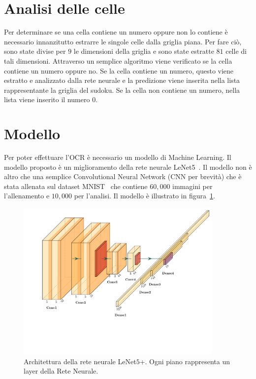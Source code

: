 \documentclass[a4paper, 10pt]{article}
\newcommand{\lenet}{LeNet\(5\)+}
\begin{document}
\section{Analisi delle celle}

Per determinare se una cella contiene un numero oppure non lo contiene è necessario innanzitutto
estrarre le singole celle dalla griglia piana. Per fare ciò, sono state divise
per \(9\) le dimensioni della griglia e sono state estratte \(81\) celle di tali
dimensioni. Attraverso un semplice algoritmo viene verificato se la cella
contiene un numero oppure no. Se la cella contiene un numero, questo viene
estratto e analizzato dalla rete neurale e la predizione viene inserita nella
lista rappresentante la griglia del sudoku. Se la cella non contiene un numero,
nella lista viene inserito il numero \(0\).


\section{Modello}

Per poter effettuare l'OCR è necessario un modello di Machine Learning. Il
modello proposto è un miglioramento della rete neurale
LeNet5~\cite{lecun1998gradient}. Il modello non è altro che una semplice
Convolutional Neural Network (CNN per brevità) che è stata allenata sul dataset
MNIST~\cite{deng2012mnist} che contiene \(60,000\) immagini per l'allenamento e
\(10,000\) per l'analisi. Il modello è illustrato in
figura~\ref{fig:architecture}. \\

\begin{figure}[h]
    \includegraphics[width=0.9\textwidth, trim = 1cm 4.5cm 0cm 1cm]{architecture.pdf}
    \caption{Architettura della rete neurale \lenet. Ogni piano rappresenta un
    layer della Rete Neurale.}\label{fig:architecture}
\end{figure}
\end{document}

